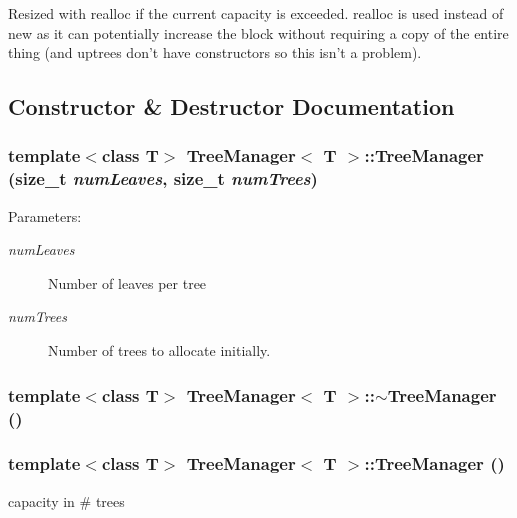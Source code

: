 Resized with realloc if the current capacity is exceeded. realloc is used instead of new as it can potentially increase the block without requiring a copy of the entire thing (and uptrees don't have constructors so this isn't a problem). 



\subsection{Constructor \& Destructor Documentation}
\subsubsection{\setlength{\rightskip}{0pt plus 5cm}template$<$class T$>$ {\bf Tree\-Manager}$<$ T $>$::{\bf Tree\-Manager} (size\_\-t {\em num\-Leaves}, size\_\-t {\em num\-Trees})}\label{classTreeManager_a0}


\begin{Desc}
\item[Parameters:]
\begin{description}
\item[{\em num\-Leaves}]Number of leaves per tree \item[{\em num\-Trees}]Number of trees to allocate initially. \end{description}
\end{Desc}
\subsubsection{\setlength{\rightskip}{0pt plus 5cm}template$<$class T$>$ {\bf Tree\-Manager}$<$ T $>$::$\sim${\bf Tree\-Manager} ()}\label{classTreeManager_a1}


\subsubsection{\setlength{\rightskip}{0pt plus 5cm}template$<$class T$>$ {\bf Tree\-Manager}$<$ T $>$::{\bf Tree\-Manager} ()\hspace{0.3cm}{\tt  [private]}}\label{classTreeManager_d0}


capacity in \# trees 



